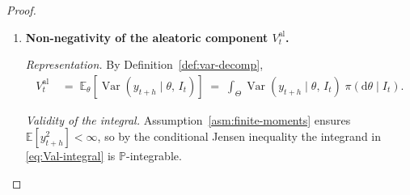 \documentclass[12pt,openany]{book}
\newcommand{\calI}{\mathcal{I}}
\newcommand{\E}{\mathbb{E}}
\numberwithin{equation}{chapter}
\theoremstyle{plain}
\theoremstyle{definition}
\theoremstyle{remark}
\numberwithin{equation}{chapter}
\theoremstyle{plain}
\DeclareMathOperator{\Var}{Var}
\def\calI{I}%
\begin{document}
\begin{proof}
\begin{enumerate}
        \noindent\textit{Non-negativity of the integrand.}
        For every $\omega \in \Omega$,
        \begin{align}
          \left(y_{t+h}(\omega) - m_\theta\right)^{\!2}
          &\;\geq\; 0,
          \label{eq:sq-nonneg}
        \end{align}
        since every real square is non-negative.

        \noindent\textit{Non-negativity of the conditional
        expectation.}
        Because the integrand in \eqref{eq:condvar-sq} is
        non-negative $\mathbb{P}$-almost surely (by
        \eqref{eq:sq-nonneg}), monotonicity of conditional
        expectation gives
        \begin{align}
          \Var(y_{t+h} \mid \theta,\, \calI_t)
          &\;=\;
            \E\!\left[
              \left(y_{t+h} - m_\theta\right)^{\!2}
            \mid \theta,\, \calI_t
            \right]
          \;\geq\; 0
          \quad \mathbb{P}\text{-a.s.}
          \label{eq:condvar-nonneg}
        \end{align}

        \noindent\textit{Boundary and edge cases.}
        If $y_{t+h} = m_\theta$ $\mathbb{P}$-a.s.\ (i.e.\
        $y_{t+h}$ is degenerate given $(\theta, \calI_t)$), then
        equality holds in \eqref{eq:condvar-nonneg}; non-negativity
        is not violated.  This concludes item~(1).

  \item \textbf{Non-negativity of the aleatoric component
        $V^{\mathrm{al}}_t$.}

        \noindent\textit{Representation.}
        By Definition~\ref{def:var-decomp},
        \begin{align}
          V^{\mathrm{al}}_t
          &\;=\;
            \E_\theta\!\left[
              \Var(y_{t+h} \mid \theta,\, \calI_t)
            \right]
          \;=\;
            \int_\Theta
              \Var(y_{t+h} \mid \theta,\, \calI_t)
            \;\pi(\mathrm{d}\theta \mid \calI_t).
          \label{eq:Val-integral}
        \end{align}

        \noindent\textit{Validity of the integral.}
        Assumption~\ref{asm:finite-moments} ensures
        $\E[y_{t+h}^2] < \infty$, so by the conditional Jensen
        inequality the integrand in \eqref{eq:Val-integral} is
        $\mathbb{P}$-integrable.


\end{enumerate}
\end{proof}
\end{document}

